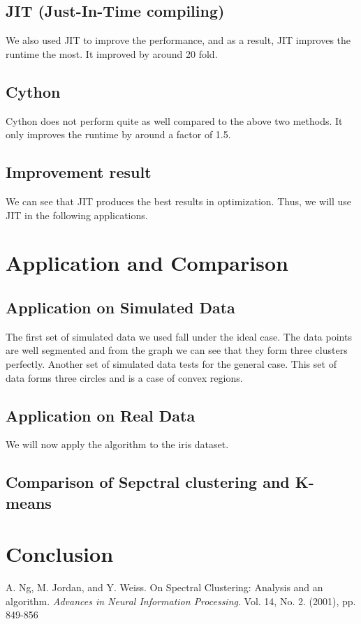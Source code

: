 \documentclass[11pt]{article}
\begin{document}
\subsection{JIT (Just-In-Time compiling) }
We also used JIT to improve the performance, and as a result, JIT improves the runtime the most. It improved by around 20 fold.
\subsection{Cython}
Cython does not perform quite as well compared to the above two methods. It only improves the runtime by around a factor of 1.5.

\subsection{Improvement result}
We can see that JIT produces the best results in optimization. Thus, we will use JIT in the following applications.

\section{Application and Comparison}
\subsection{Application on Simulated Data}
The first set of simulated data we used fall under the ideal case. The data points are well segmented and from the graph we can see that they form three clusters perfectly. Another set of simulated data tests for the general case. This set of data forms three circles and is a case of convex regions.
\subsection{Application on Real Data}
We will now apply the algorithm to the iris dataset.
\subsection{Comparison of Sepctral clustering and K-means}



\section{Conclusion}

%
%


\newpage
\begin{thebibliography}{9}



A. Ng, M. Jordan, and Y. Weiss.
On Spectral Clustering: Analysis and an algorithm.
\textit{Advances in Neural Information Processing}.
Vol. 14, No. 2. (2001), pp. 849-856 

\end{thebibliography}
\end{document}
